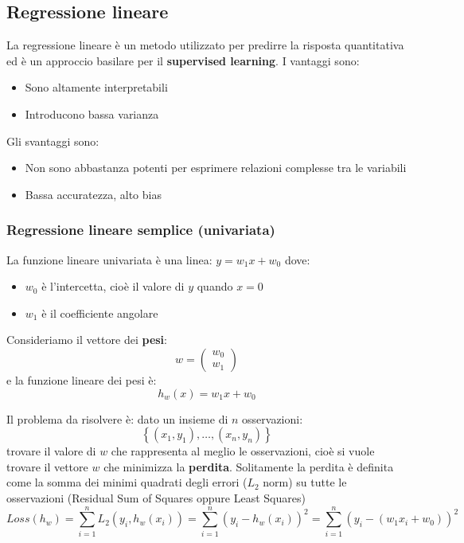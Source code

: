 \documentclass[a4paper]{article}
\begin{document}
\subsection{Regressione lineare}
La regressione lineare è un metodo utilizzato per predirre la risposta quantitativa
ed è un approccio basilare per il \textbf{supervised learning}.
I vantaggi sono:
\begin{itemize}
  \item Sono altamente interpretabili
  \item Introducono bassa varianza
\end{itemize}
Gli svantaggi sono:
\begin{itemize}
  \item Non sono abbastanza potenti per esprimere relazioni complesse tra le variabili
  \item Bassa accuratezza, alto bias
\end{itemize}

\subsubsection{Regressione lineare semplice (univariata)}
La funzione lineare univariata è una linea: $y = w_1 x + w_0$ dove:
\begin{itemize}
  \item \( w_0 \) è l'intercetta, cioè il valore di \( y \) quando \( x = 0 \)
  \item \( w_1 \) è il coefficiente angolare
\end{itemize}
Consideriamo il vettore dei \textbf{pesi}:
\[
  w = 
  \begin{pmatrix}
    w_0 \\
    w_1
  \end{pmatrix}
\]
e la funzione lineare dei pesi è:
\[
  h_w(x) = w_1 x + w_0
\] 

\vspace{1em}
\noindent
Il problema da risolvere è: dato un insieme di \( n \) osservazioni:
\[
  \left\{ (x_1,y_1), \ldots, (x_n,y_n) \right\}
\] 
trovare il valore di \( w \) che rappresenta al meglio le osservazioni, cioè si vuole
trovare il vettore \( w \) che minimizza la \textbf{perdita}. Solitamente la perdita
è definita come la somma dei minimi quadrati degli errori (\( L_2 \) norm) su tutte le osservazioni
(Residual Sum of Squares oppure Least Squares)
\[
  Loss(h_w) = \sum_{i=1}^{n} L_2(y_i, h_w(x_i)) = \sum_{i=1}^{n} (y_i - h_w(x_i))^2
  = \sum_{i=1}^{n} (y_i - (w_1 x_i + w_0))^2
\] 
\end{document}

